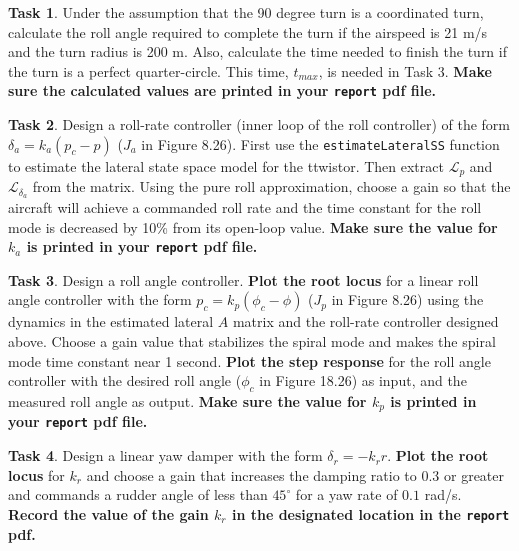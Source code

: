 \documentclass{article}
\theoremstyle{definition}
\newtheorem{task}{Task}
\begin{document}
\begin{task}
    Under the assumption that the 90 degree turn is a coordinated turn, calculate the roll angle required to complete the turn if the airspeed is 21 m/s and the turn radius is 200 m. Also, calculate the time needed to finish the turn if the turn is a perfect quarter-circle. This time, $t_{max}$, is needed in Task 3. \textbf{Make sure the calculated values are printed in your \texttt{report} pdf file.}
\end{task}

\begin{task} \label{task:rollrate}
    Design a roll-rate controller (inner loop of the roll controller) of the form $\delta_a = k_a (p_c - p)$ ($J_a$ in Figure 8.26). First use the \texttt{estimateLateralSS} function to estimate the lateral state space model for the ttwistor. Then extract $\mathcal{L}_p$ and $\mathcal{L}_{\delta_a}$ from the matrix. Using the pure roll approximation, choose a gain so that the aircraft will achieve a commanded roll rate and the time constant for the roll mode is decreased by 10\% from its open-loop value.
    \textbf{Make sure the value for $k_a$ is printed in your \texttt{report} pdf file.}
\end{task}

\begin{task}
    Design a roll angle controller. \textbf{Plot the root locus} for a linear roll angle controller with the form $p_c = k_p (\phi_c - \phi)$ ($J_p$ in Figure 8.26) using the dynamics in the estimated lateral $A$ matrix and the roll-rate controller designed above. Choose a gain value that stabilizes the spiral mode and makes the spiral mode time constant near 1 second. \textbf{Plot the step response} for the roll angle controller with the desired roll angle ($\phi_c$ in Figure 18.26) as input, and the measured roll angle as output.
    \textbf{Make sure the value for $k_p$ is printed in your \texttt{report} pdf file.}
\end{task}

\begin{task} \label{task:yaw}
    Design a linear yaw damper with the form $\delta_r = -k_r r$. \textbf{Plot the root locus} for $k_r$ and choose a gain that increases the damping ratio to $0.3$ or greater and commands a rudder angle of less than $45^\circ$ for a yaw rate of $0.1$ rad/s. \textbf{Record the value of the gain $k_r$ in the designated location in the \texttt{report} pdf.}
\end{task}
\end{document}

